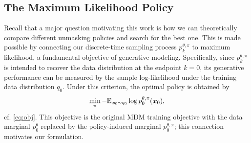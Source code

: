 \subsection{The Maximum Likelihood Policy}
Recall that a major question motivating this work is how we can theoretically compare different unmasking policies and search for the best one. This is made possible by connecting our discrete-time sampling process $p_k^{\theta,\pi}$ to maximum likelihood, 
a fundamental objective of generative modeling. Specifically, since $p_k^{\theta,\pi}$ is intended to recover the data distribution at the endpoint $k=0$, its generative performance can be measured by the sample log-likelihood under the training data distribution $q_0$. Under this criterion, the optimal policy is obtained by
\begin{align}\label{eq:min-obj}
    \min_\pi-\mathbb{E}_{\bm x_0\sim q_0}\log p_0^{\theta,\pi}(\bm x_0),
\end{align}
cf. \eqref{eq:obj}. This objective is the original MDM training objective with the data marginal $p_0^\theta$ replaced by the policy-induced marginal $p_0^{\theta,\pi}$; this connection motivates our formulation.

